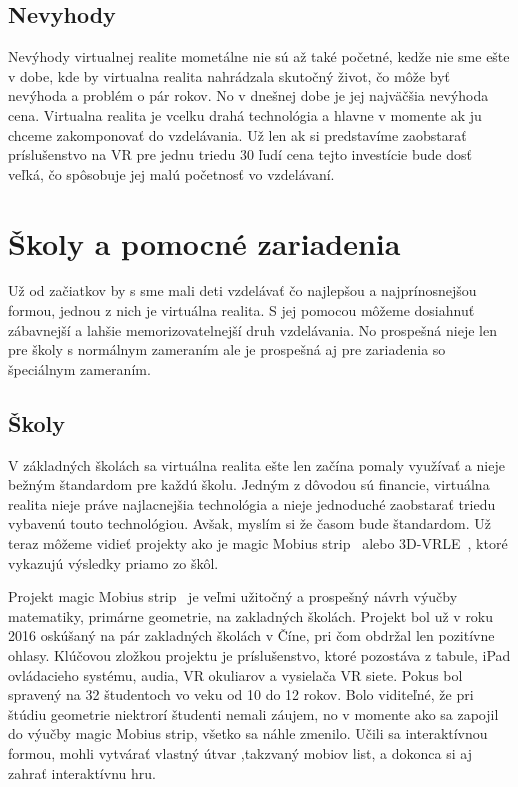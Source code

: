 \documentclass[10pt,twoside,slovak,a4paper]{article}
\begin{document}
\subsection{Nevyhody} \label{procon:nevyhody}
Nevýhody virtualnej realite mometálne nie sú až také početné, kedže nie sme ešte v dobe, kde by virtualna realita nahrádzala skutočný život, čo môže byť nevýhoda a problém o pár rokov. No v dnešnej dobe je jej najväčšia nevýhoda cena. Virtualna realita je vcelku drahá technológia a hlavne v momente ak ju chceme zakomponovať do vzdelávania. Už len ak si predstavíme zaobstarať príslušenstvo na VR pre jednu triedu 30 ľudí cena tejto investície bude dosť veľká, čo spôsobuje jej malú početnosť vo vzdelávaní.  

\section{Školy a pomocné zariadenia} \label{školy}
Už od začiatkov by s sme mali deti vzdelávať čo najlepšou a najprínosnejšou formou, jednou z nich je virtuálna realita. S jej pomocou môžeme dosiahnuť zábavnejší a lahšie memorizovatelnejší druh vzdelávania. No prospešná nieje len pre školy s normálnym zameraním ale je prospešná aj pre zariadenia so špeciálnym zameraním. 

\subsection{Školy} \label{školy:školy}
V základných školách sa virtuálna realita ešte len začína pomaly využívať a nieje bežným štandardom pre každú školu. Jedným z dôvodou sú financie, virtuálna realita nieje práve najlacnejšia technológia a nieje jednoduché zaobstarať triedu vybavenú touto technológiou. Avšak, myslím si že časom bude štandardom. Už teraz môžeme vidieť projekty ako je magic Mobius strip~\cite{Math} alebo 3D-VRLE~\cite{Physics}, ktoré vykazujú výsledky priamo zo škôl. 

Projekt magic Mobius strip~\cite{Math} je veľmi užitočný a prospešný návrh výučby matematiky, primárne geometrie, na zakladných školách. Projekt bol už v roku 2016 oskúšaný na pár zakladných školách v Číne, pri čom obdržal len pozitívne ohlasy. Klúčovou zložkou projektu je príslušenstvo, ktoré pozostáva z tabule, iPad ovládacieho systému, audia, VR okuliarov a vysielača VR siete. Pokus bol spravený na 32 študentoch vo veku od 10 do 12 rokov. Bolo viditeľné, že pri štúdiu geometrie niektrorí študenti nemali záujem, no v momente ako sa zapojil do výučby magic Mobius strip, všetko sa náhle zmenilo. Učili sa interaktívnou formou, mohli vytvárať vlastný útvar ,takzvaný mobiov list, a dokonca si aj zahrať interaktívnu hru.
\end{document}
